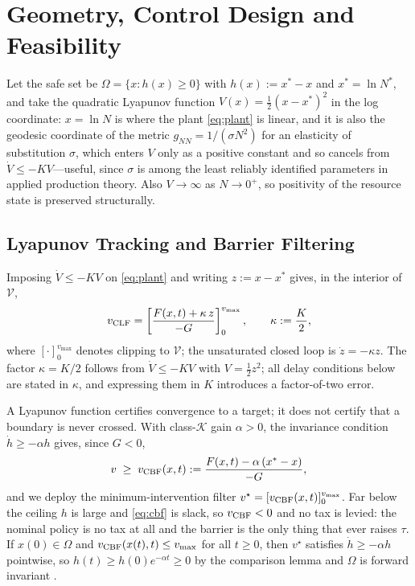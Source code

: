 \documentclass[conference,letterpaper,10pt]{IEEEtran}
\theoremstyle{plain}
\theoremstyle{remark}
\newcommand{\Nt}{N^{\ast}}
\newcommand{\xt}{x^{\ast}}
\begin{document}
\section{Geometry, Control Design and Feasibility}
\label{sec:control}
Let the safe set be $\Omega=\{x:h(x)\ge0\}$ with $h(x):=\xt-x$ and
$\xt=\ln\Nt$, and take the quadratic Lyapunov function
$V(x)=\tfrac12(x-\xt)^2$ in the log coordinate: $x=\ln N$ is where the
plant \eqref{eq:plant} is linear, and it is also the geodesic
coordinate of the metric $g_{NN}=1/(\sigma N^2)$ for an elasticity of
substitution $\sigma$, which enters $V$ only as a positive constant and
so cancels from $\dot V\le-KV$---useful, since $\sigma$ is among the
least reliably identified parameters in applied production theory.
Also $V\to\infty$ as $N\to0^{+}$, so positivity of the resource state
is preserved structurally.

\subsection{Lyapunov Tracking and Barrier Filtering}
Imposing $\dot V\le-KV$ on \eqref{eq:plant} and writing $z:=x-\xt$
gives, in the interior of $\mathcal{V}$,
\begin{equation}
\label{eq:clf}
    v_{\rm CLF} = \left[\frac{F(x,t) + \kappa\,z}{-G}\right]_0^{v_{\max}},
    \qquad \kappa := \frac{K}{2},
\end{equation}
where $[\cdot]_0^{v_{\max}}$ denotes clipping to $\mathcal{V}$; the
unsaturated closed loop is $\dot z=-\kappa z$. The factor $\kappa=K/2$
follows from $\dot V\le-KV$ with $V=\tfrac12z^2$; all delay conditions
below are stated in $\kappa$, and expressing them in $K$ introduces a
factor-of-two error.

A Lyapunov function certifies convergence to a target; it does not
certify that a boundary is never crossed. With class-$\mathcal{K}$ gain
$\alpha>0$, the invariance condition $\dot h\ge-\alpha h$ gives, since
$G<0$,
\begin{equation}
\label{eq:cbf}
    v \;\ge\; v_{\rm CBF}(x,t) := \frac{F(x,t)-\alpha\,(\xt-x)}{-G},
\end{equation}
and we deploy the minimum-intervention filter
$v^{\star}=[v_{\rm CBF}(x,t)]_0^{v_{\max}}$. Far below the ceiling $h$
is large and \eqref{eq:cbf} is slack, so $v_{\rm CBF}<0$ and no tax is
levied: the nominal policy is no tax at all and the barrier is the only
thing that ever raises $\tau$. If $x(0)\in\Omega$ and
$v_{\rm CBF}(x(t),t)\le v_{\max}$ for all $t\ge0$, then $v^\star$
satisfies $\dot h\ge-\alpha h$ pointwise, so
$h(t)\ge h(0)e^{-\alpha t}\ge0$ by the comparison lemma and $\Omega$ is
forward invariant \cite{ames2017}.
\end{document}
